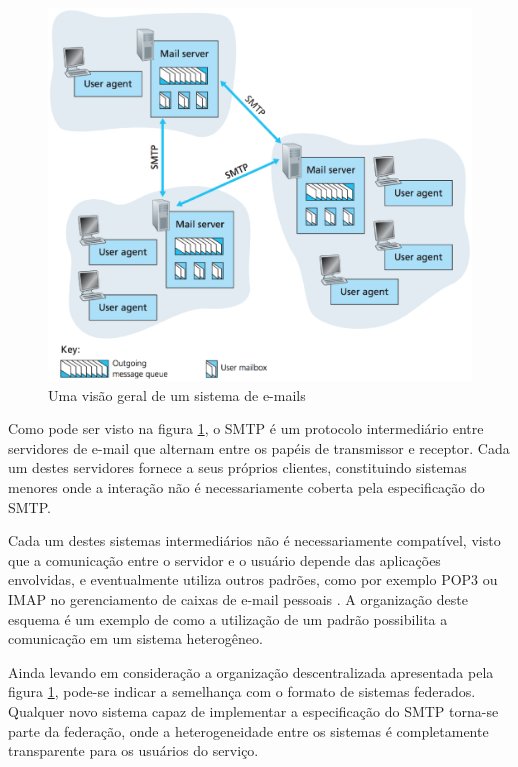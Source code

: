 \begin{figure}[h]
	\centering
		\includegraphics[keepaspectratio=true,scale=0.6]{figuras/smtp_internet.eps}
	\caption{Uma visão geral de um sistema de e-mails \cite{kurose2012}}
	\label{fig:smtpInternet}
\end{figure}

Como pode ser visto na figura \ref{fig:smtpInternet}, o SMTP é um protocolo
intermediário entre servidores de e-mail que alternam entre os papéis de transmissor
e receptor. Cada um destes servidores fornece a seus próprios clientes, constituindo
sistemas menores onde a interação não é necessariamente coberta pela especificação
do SMTP.

Cada um destes sistemas intermediários não é necessariamente compatível, visto que a
comunicação entre o servidor e o usuário depende das aplicações envolvidas, e
eventualmente utiliza outros padrões, como por exemplo POP3 ou IMAP no gerenciamento
de caixas de e-mail pessoais \cite{tanenbaum2010}. A organização deste esquema é um
exemplo de como a utilização de um padrão possibilita a comunicação em um sistema
heterogêneo.

Ainda levando em consideração a organização descentralizada apresentada pela figura
\ref{fig:smtpInternet}, pode-se indicar a semelhança com o formato de sistemas
federados. Qualquer novo sistema capaz de implementar a especificação do SMTP
torna-se parte da federação, onde a heterogeneidade entre os sistemas é
completamente transparente para os usuários do serviço.

